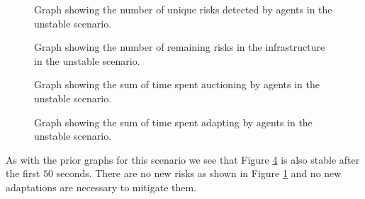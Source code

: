 \begin{figure}[H]
    \centering
        
    \caption{Graph showing the number of unique risks detected by agents in the unstable scenario.}
    \label{fig:risk-count-unstable}
\end{figure}

\begin{figure}[H]
    \centering
        
    \caption{Graph showing the number of remaining risks in the infrastructure in the unstable scenario.}
    \label{fig:risk-remaining-unstable}
\end{figure}


\begin{figure}[H]
    \centering
        
    \caption{Graph showing the sum of time spent auctioning by agents in the unstable scenario.}
    \label{fig:auctioning-time-unstable}
\end{figure}

\begin{figure}[H]
    \centering
        
    \caption{Graph showing the sum of time spent adapting by agents in the unstable scenario.}
    \label{fig:adapting-time-unstable}
\end{figure}

As with the prior graphs for this scenario we see that Figure \ref{fig:adapting-time-unstable} is also stable after the first $50$ seconds. There are no new risks as shown in Figure \ref{fig:risk-count-unstable} and no new adaptations are necessary to mitigate them. 
